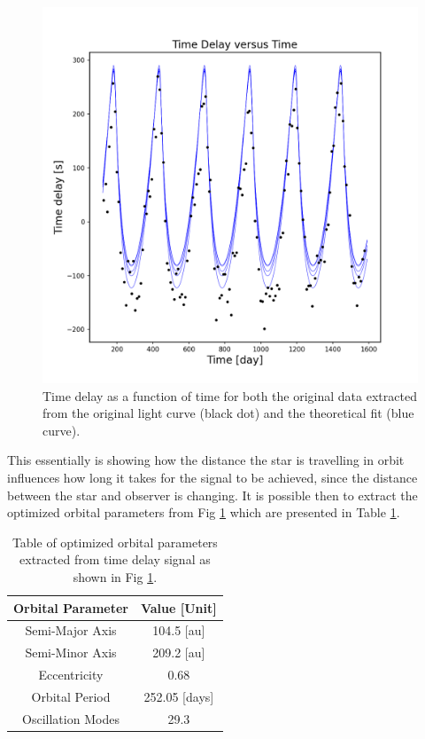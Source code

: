 \documentclass[]{article}
\begin{document}
\begin{figure}[H]
    \centering
    \includegraphics[width=1\linewidth]{time_delay.png}
    \caption{Time delay as a function of time for both the original data extracted from the original light curve (black dot) and the theoretical fit (blue curve).}
    \label{fig:timedelay}
\end{figure}
This essentially is showing how the distance the star is travelling in orbit influences how long it takes for the signal to be achieved, since the distance between the star and observer is changing. It is possible then to extract the optimized orbital parameters from Fig \ref{fig:timedelay} which are presented in Table \ref{tab: OptParam}.
\begin{table}[htp] 
\centering
\caption{Table of optimized orbital parameters extracted from time delay signal as shown in Fig \ref{fig:timedelay}.}
\setlength{\extrarowheight}{2pt}
\begin{tabular}{c | c}
    \hline \hline
Orbital Parameter & Value [Unit]\\
\hline
    Semi-Major Axis  & 104.5 [au]  \\
    Semi-Minor Axis & 209.2 [au] \\
    Eccentricity & 0.68 \\
    Orbital Period & 252.05 [days] \\
    Oscillation Modes & 29.3 \\
    \hline
\end{tabular} 
\label{tab: OptParam}
\end{table}
\end{document}

